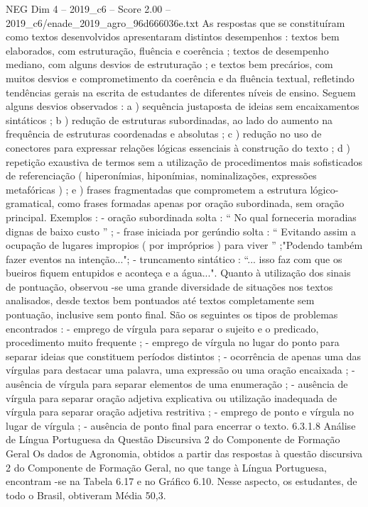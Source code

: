 \begin{textsample}{NEG Dim 4 – 2019\_c6 – Score 2.00 – 2019\_c6/enade\_2019\_agro\_96d666036e.txt}
As respostas que se constituíram como textos desenvolvidos apresentaram distintos desempenhos : textos bem elaborados, com estruturação, fluência e coerência ; textos de desempenho mediano, com alguns desvios de estruturação ; e textos bem precários, com muitos desvios e comprometimento da coerência e da fluência textual, refletindo tendências gerais na escrita de estudantes de diferentes níveis de ensino.
Seguem alguns desvios observados : a ) sequência justaposta de ideias sem encaixamentos sintáticos ; b ) redução de estruturas subordinadas, ao lado do aumento na frequência de estruturas coordenadas e absolutas ; c ) redução no uso de conectores para expressar relações lógicas essenciais à construção do texto ; d ) repetição exaustiva de termos sem a utilização de procedimentos mais sofisticados de referenciação ( hiperonímias, hiponímias, nominalizações, expressões metafóricas ) ; e ) frases fragmentadas que comprometem a estrutura lógico-gramatical, como frases formadas apenas por oração subordinada, sem oração principal.
Exemplos : - oração subordinada solta : “ No qual forneceria moradias dignas de baixo custo ” ; - frase iniciada por gerúndio solta : “ Evitando assim a ocupação de lugares impropios ( por impróprios ) para viver ” ;"Podendo também fazer eventos na intenção..."; - truncamento sintático : “... isso faz com que os bueiros fiquem entupidos e aconteça e a água...".
Quanto à utilização dos sinais de pontuação, observou -se uma grande diversidade de situações nos textos analisados, desde textos bem pontuados até textos completamente sem pontuação, inclusive sem ponto final.
São os seguintes os tipos de problemas encontrados : - emprego de vírgula para separar o sujeito e o predicado, procedimento muito frequente ; - emprego de vírgula no lugar do ponto para separar ideias que constituem períodos distintos ; - ocorrência de apenas uma das vírgulas para destacar uma palavra, uma expressão ou uma oração encaixada ; - ausência de vírgula para separar elementos de uma enumeração ; - ausência de vírgula para separar oração adjetiva explicativa ou utilização inadequada de vírgula para separar oração adjetiva restritiva ; - emprego de ponto e vírgula no lugar de vírgula ; - ausência de ponto final para encerrar o texto. 6.3.1.8 Análise de Língua Portuguesa da Questão Discursiva 2 do Componente de Formação Geral Os dados de Agronomia, obtidos a partir das respostas à questão discursiva 2 do Componente de Formação Geral, no que tange à Língua Portuguesa, encontram -se na Tabela 6.17 e no Gráfico 6.10.
Nesse aspecto, os estudantes, de todo o Brasil, obtiveram Média 50,3.

\end{textsample}
